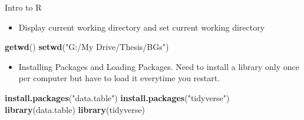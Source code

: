\documentclass[ignorenonframetext,]{beamer}
\newenvironment{Shaded}{\begin{snugshade}}{\end{snugshade}}
\newcommand{\KeywordTok}[1]{\textcolor[rgb]{0.13,0.29,0.53}{\textbf{#1}}}
\newcommand{\NormalTok}[1]{#1}
\newcommand{\StringTok}[1]{\textcolor[rgb]{0.31,0.60,0.02}{#1}}
\providecommand{\tightlist}{%
  \setlength{\itemsep}{0pt}\setlength{\parskip}{0pt}}
\begin{document}
\begin{frame}[fragile]{Intro to R}
\protect\hypertarget{intro-to-r}{}

\begin{itemize}
\tightlist
\item
  Display current working directory and set current working directory
\end{itemize}

\begin{Shaded}
\begin{Highlighting}[]
\KeywordTok{getwd}\NormalTok{()}
\KeywordTok{setwd}\NormalTok{(}\StringTok{"G:/My Drive/Thesis/BGs"}\NormalTok{)}
\end{Highlighting}
\end{Shaded}

\begin{itemize}
\tightlist
\item
  Installing Packages and Loading Packages. Need to install a library
  only once per computer but have to load it everytime you restart.
\end{itemize}

\begin{Shaded}
\begin{Highlighting}[]
\KeywordTok{install.packages}\NormalTok{(}\StringTok{"data.table"}\NormalTok{)}
\KeywordTok{install.packages}\NormalTok{(}\StringTok{"tidyverse"}\NormalTok{)}
\KeywordTok{library}\NormalTok{(data.table)}
\KeywordTok{library}\NormalTok{(tidyverse)}
\end{Highlighting}
\end{Shaded}

\end{frame}
\end{document}
